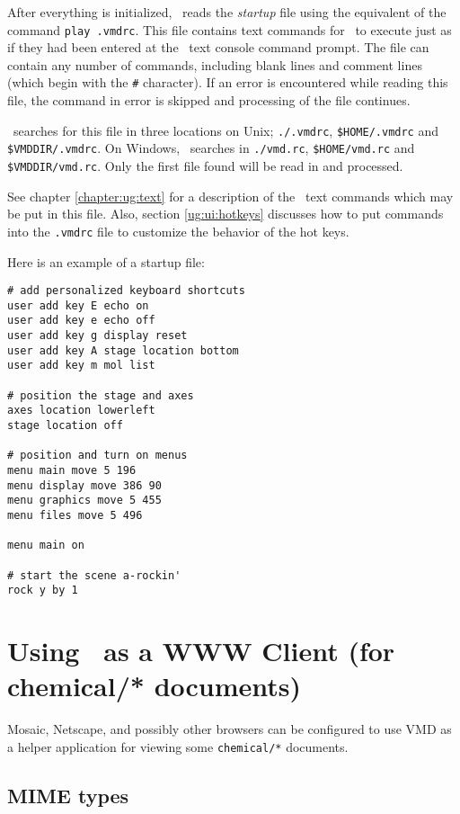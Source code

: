 After everything is initialized, \VMD\ reads the {\em startup} file
using the equivalent of the command {\tt play .vmdrc}.  
This file contains text commands for \VMD\ to execute just as if they had been
entered at the \VMD\ text console command prompt.  The file can
contain any number of commands, including blank lines and comment
lines (which begin with the {\tt \#} character).  If an error is
encountered while reading this file, the command in error is skipped
and processing of the file continues.

\VMD\ searches for this file in three locations on Unix;
{\tt ./.vmdrc}, {\tt \$HOME/.vmdrc} and {\tt \$VMDDIR/.vmdrc}.
On Windows, \VMD\ searches in
{\tt ./vmd.rc}, {\tt \$HOME/vmd.rc} and {\tt \$VMDDIR/vmd.rc}.
Only the first file found will be read in and processed.

See chapter \ref{chapter:ug:text} 
for a description of the \VMD\ text
commands which may be put in this file.  Also,
section \ref{ug:ui:hotkeys} discusses how to put
commands into the {\tt .vmdrc} file to customize the behavior of the
hot keys.

Here is an example of a startup file:
\begin{verbatim}
# add personalized keyboard shortcuts 
user add key E echo on
user add key e echo off
user add key g display reset
user add key A stage location bottom
user add key m mol list

# position the stage and axes
axes location lowerleft
stage location off

# position and turn on menus
menu main move 5 196
menu display move 386 90
menu graphics move 5 455
menu files move 5 496

menu main on

# start the scene a-rockin'
rock y by 1
\end{verbatim}

\section{Using \VMD\ as a WWW Client (for chemical/* documents)}
\label{ug:topic:www:client}

Mosaic, Netscape, and possibly other browsers can be configured to use VMD as a helper application for viewing some {\tt chemical/*} documents.

\subsection{MIME types}

